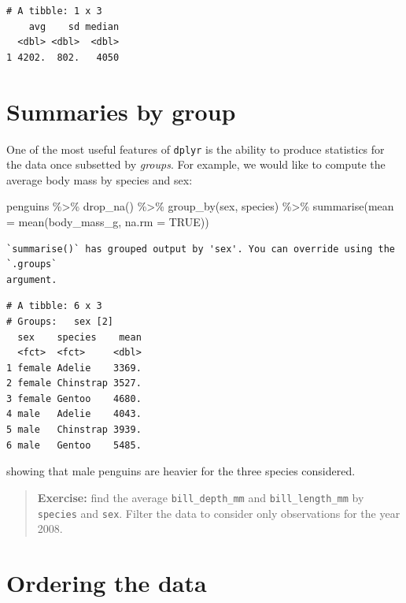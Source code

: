 \documentclass[
  letterpaper,
  DIV=11,
  numbers=noendperiod]{scrreprt}
\newenvironment{Shaded}{\begin{snugshade}}{\end{snugshade}}
\newcommand{\AttributeTok}[1]{\textcolor[rgb]{0.40,0.45,0.13}{#1}}
\newcommand{\ConstantTok}[1]{\textcolor[rgb]{0.56,0.35,0.01}{#1}}
\newcommand{\FunctionTok}[1]{\textcolor[rgb]{0.28,0.35,0.67}{#1}}
\newcommand{\NormalTok}[1]{\textcolor[rgb]{0.00,0.23,0.31}{#1}}
\newcommand{\SpecialCharTok}[1]{\textcolor[rgb]{0.37,0.37,0.37}{#1}}
\begin{document}
\begin{verbatim}
# A tibble: 1 x 3
    avg    sd median
  <dbl> <dbl>  <dbl>
1 4202.  802.   4050
\end{verbatim}

\hypertarget{summaries-by-group}{%
\section{Summaries by group}\label{summaries-by-group}}

One of the most useful features of \texttt{dplyr} is the ability to
produce statistics for the data once subsetted by \emph{groups}. For
example, we would like to compute the average body mass by species and
sex:

\begin{Shaded}
\begin{Highlighting}[]
\NormalTok{penguins }\SpecialCharTok{\%\textgreater{}\%} 
  \FunctionTok{drop\_na}\NormalTok{() }\SpecialCharTok{\%\textgreater{}\%} 
  \FunctionTok{group\_by}\NormalTok{(sex, species) }\SpecialCharTok{\%\textgreater{}\%} 
  \FunctionTok{summarise}\NormalTok{(}\AttributeTok{mean =} \FunctionTok{mean}\NormalTok{(body\_mass\_g, }\AttributeTok{na.rm =} \ConstantTok{TRUE}\NormalTok{))}
\end{Highlighting}
\end{Shaded}

\begin{verbatim}
`summarise()` has grouped output by 'sex'. You can override using the `.groups`
argument.
\end{verbatim}

\begin{verbatim}
# A tibble: 6 x 3
# Groups:   sex [2]
  sex    species    mean
  <fct>  <fct>     <dbl>
1 female Adelie    3369.
2 female Chinstrap 3527.
3 female Gentoo    4680.
4 male   Adelie    4043.
5 male   Chinstrap 3939.
6 male   Gentoo    5485.
\end{verbatim}

showing that male penguins are heavier for the three species considered.

\begin{quote}
\textbf{Exercise:} find the average \texttt{bill\_depth\_mm} and
\texttt{bill\_length\_mm} by \texttt{species} and \texttt{sex}. Filter
the data to consider only observations for the year 2008.
\end{quote}

\hypertarget{ordering-the-data}{%
\section{Ordering the data}\label{ordering-the-data}}
\end{document}
